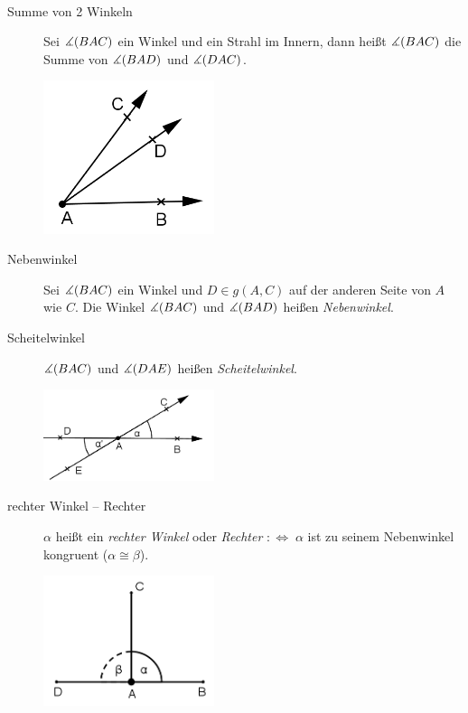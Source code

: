 \begin{defi}\
    \renewcommand{\labelenumi}{\alph{enumi})} %
    \begin{description}
        \item[Summe von 2 Winkeln] Sei $\mbox{$\measuredangle$}(BAC)$ ein Winkel und  ein Strahl im Innern, dann
            heißt $\mbox{$\measuredangle$}(BAC)$ die Summe von $\mbox{$\measuredangle$}(BAD)$ und $\mbox{$\measuredangle$}(DAC)$.

            \centerline{\includegraphics[width=5cm]{BILDER/1-2-12a-Winkel.png}}

        \item[Nebenwinkel] Sei $\mbox{$\measuredangle$}(BAC)$ ein Winkel und $D \in g(A,C)$ auf der anderen Seite von
            $A$ wie $C$. Die Winkel $\mbox{$\measuredangle$}(BAC)$ und $\mbox{$\measuredangle$}(BAD)$ heißen \emph{Nebenwinkel}.


        \item[Scheitelwinkel] $\mbox{$\measuredangle$}(BAC)$ und $\mbox{$\measuredangle$}(DAE)$ heißen \emph{Scheitelwinkel}.

            \centerline{\includegraphics[width=5cm]{BILDER/1-2-12c-Winkel.png}}

        \item[rechter Winkel -- Rechter] $\alpha$ heißt ein \emph{rechter Winkel} oder
            \emph{Rechter} $:\Longleftrightarrow\; \alpha$ ist zu seinem Nebenwinkel kongruent
            ($\alpha\cong\beta$).

        \centerline{\includegraphics[width=5cm]{BILDER/1-2-12d-Rechter.png}}
    \end{description}
\end{defi}

